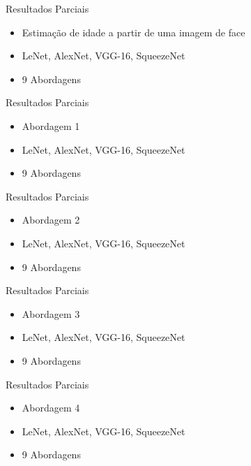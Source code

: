 
\begin{frame}{Resultados Parciais}
 \begin{itemize}
   \item Estimação de idade a partir de uma imagem de face
   \item LeNet, AlexNet, VGG-16, SqueezeNet
   \ \ \newline
   \item \alert{9 Abordagens}
   \end{itemize}
\end{frame}


\begin{frame}{Resultados Parciais}
 \begin{itemize}
   \item Abordagem 1
   \item LeNet, AlexNet, VGG-16, SqueezeNet
   \ \ \newline
   \item \alert{9 Abordagens}
   \end{itemize}
\end{frame}

\begin{frame}{Resultados Parciais}
 \begin{itemize}
   \item Abordagem 2
   \item LeNet, AlexNet, VGG-16, SqueezeNet
   \ \ \newline
   \item \alert{9 Abordagens}
   \end{itemize}
\end{frame}

\begin{frame}{Resultados Parciais}
 \begin{itemize}
   \item Abordagem 3
   \item LeNet, AlexNet, VGG-16, SqueezeNet
   \ \ \newline
   \item \alert{9 Abordagens}
   \end{itemize}
\end{frame}

\begin{frame}{Resultados Parciais}
 \begin{itemize}
   \item Abordagem 4
   \item LeNet, AlexNet, VGG-16, SqueezeNet
   \ \ \newline
   \item \alert{9 Abordagens}
   \end{itemize}
\end{frame}

